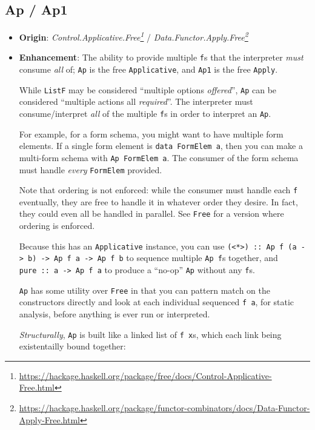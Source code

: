 \documentclass[]{article}
\renewcommand{\href}[2]{#2\footnote{\url{#1}}}
\begin{document}
\hypertarget{ap-ap1}{%
\subsection{Ap / Ap1}\label{ap-ap1}}

\begin{itemize}
\item
  \textbf{Origin}:
  \emph{\href{https://hackage.haskell.org/package/free/docs/Control-Applicative-Free.html}{Control.Applicative.Free}}
  /
  \emph{\href{https://hackage.haskell.org/package/functor-combinators/docs/Data-Functor-Apply-Free.html}{Data.Functor.Apply.Free}}
\item
  \textbf{Enhancement}: The ability to provide multiple \texttt{f}s that the
  interpreter \emph{must} consume \emph{all} of; \texttt{Ap} is the free
  \texttt{Applicative}, and \texttt{Ap1} is the free \texttt{Apply}.

  While \texttt{ListF} may be considered ``multiple options \emph{offered}'',
  \texttt{Ap} can be considered ``multiple actions all \emph{required}''. The
  interpreter must consume/interpret \emph{all} of the multiple \texttt{f}s in
  order to interpret an \texttt{Ap}.

  For example, for a form schema, you might want to have multiple form elements.
  If a single form element is \texttt{data\ FormElem\ a}, then you can make a
  multi-form schema with \texttt{Ap\ FormElem\ a}. The consumer of the form
  schema must handle \emph{every} \texttt{FormElem} provided.

  Note that ordering is not enforced: while the consumer must handle each
  \texttt{f} eventually, they are free to handle it in whatever order they
  desire. In fact, they could even all be handled in parallel. See \texttt{Free}
  for a version where ordering is enforced.

  Because this has an \texttt{Applicative} instance, you can use
  \texttt{(\textless{}*\textgreater{})\ ::\ Ap\ f\ (a\ -\textgreater{}\ b)\ -\textgreater{}\ Ap\ f\ a\ -\textgreater{}\ Ap\ f\ b}
  to sequence multiple \texttt{Ap\ f}s together, and
  \texttt{pure\ ::\ a\ -\textgreater{}\ Ap\ f\ a} to produce a ``no-op''
  \texttt{Ap} without any \texttt{f}s.

  \texttt{Ap} has some utility over \texttt{Free} in that you can pattern match
  on the constructors directly and look at each individual sequenced
  \texttt{f\ a}, for static analysis, before anything is ever run or
  interpreted.

  \emph{Structurally}, \texttt{Ap} is built like a linked list of
  \texttt{f\ x}s, which each link being existentailly bound together:


\end{itemize}
\end{document}
